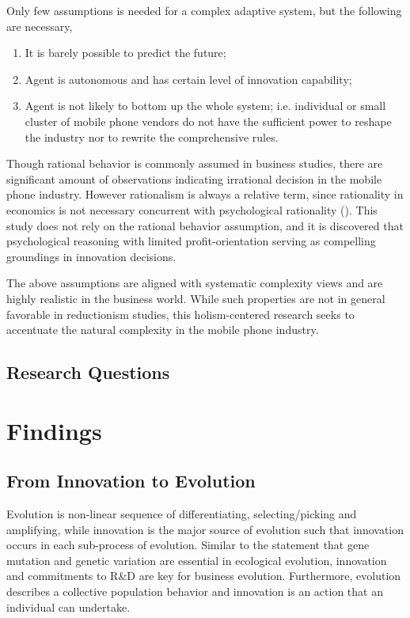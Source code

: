 \documentclass[utf8,english]{gradu3}
\begin{document}
Only few assumptions is needed for a complex adaptive system, but the following are necessary,

\begin{enumerate}
    \item It is barely possible to predict the future;
    \item Agent is autonomous and has certain level of innovation capability;
    \item Agent is not likely to bottom up the whole system; i.e. individual or small cluster of mobile phone vendors do not have the sufficient power to reshape the industry nor to rewrite the comprehensive rules.
\end{enumerate}

Though rational behavior is commonly assumed in business studies, there are significant amount of observations indicating irrational decision in the mobile phone industry. However rationalism is always a relative term, since rationality in economics is not necessary concurrent with psychological rationality (\cite{hogarth1987rational}). This study does not rely on the rational behavior assumption, and it is discovered that psychological reasoning with limited profit-orientation serving as compelling groundings in innovation decisions. 

The above assumptions are aligned with systematic complexity views and are highly realistic in the business world. While such properties are not in general favorable in reductionism studies, this holism-centered research seeks to accentuate the natural complexity in the mobile phone industry.

\section{Research Questions}

\chapter{Findings}

\section{From Innovation to Evolution}

Evolution is non-linear sequence of differentiating, selecting/picking and amplifying, while innovation is the major source of evolution such that innovation occurs in each sub-process of evolution. Similar to the statement that gene mutation and genetic variation are essential in ecological evolution, innovation and commitments to R\&D are key for business evolution. Furthermore, evolution describes a collective population behavior and innovation is an action that an individual can undertake.
\end{document}
